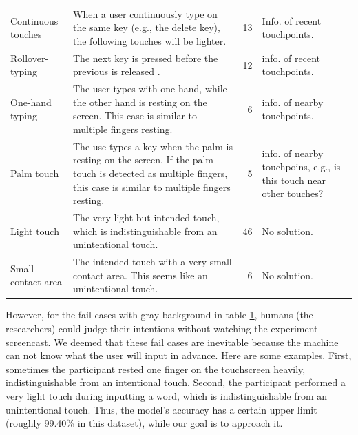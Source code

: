 \begin{table}[htbp]
\begin{tabular}{|p{8.5em}|p{21em}|r|p{10.5em}|}
    \midrule
    \rowcolor[rgb]{ 1,  .902,  .6} \multicolumn{4}{|l|}{\textbf{False Negatives}} \\
    \midrule
    Continuous touches & When a user continuously type on the same key (e.g., the delete key), the following touches will be lighter. & 13    & Info. of recent touchpoints. \\
    \midrule
    Rollover-typing & The next key is pressed before the previous is released \cite{2018-Observations}. & 12    & info. of recent touchpoints. \\
    \midrule
    One-hand typing & The user types with one hand, while the other hand is resting on the screen. This case is similar to multiple fingers resting. & 6     & info. of nearby touchpoints. \\
    \midrule
    Palm touch & The use types a key when the palm is resting on the screen. If the palm touch is detected as multiple fingers, this case is similar to multiple fingers resting. & 5     & info. of nearby touchpoins, e.g., is this touch near other touches? \\
    \midrule
    \rowcolor[rgb]{ .949,  .949,  .949} Light touch & The very light but intended touch, which is indistinguishable from an unintentional touch. & 46    & No solution. \\
    \midrule
    \rowcolor[rgb]{ .949,  .949,  .949} Small contact area & The intended touch with a very small contact area. This seems like an unintentional touch. & 6     & No solution. \\
    \bottomrule
    \end{tabular}%
  \label{tab:fail_cases}%
\end{table}%

However, for the fail cases with gray background in table \ref{tab:fail_cases}, humans (the researchers) could judge their intentions without watching the experiment screencast. We deemed that these fail cases are inevitable because the machine can not know what the user will input in advance. Here are some examples. First, sometimes the participant rested one finger on the touchscreen heavily, indistinguishable from an intentional touch. Second, the participant performed a very light touch during inputting a word, which is indistinguishable from an unintentional touch. Thus, the model's accuracy has a certain upper limit (roughly 99.40\% in this dataset), while our goal is to approach it.

